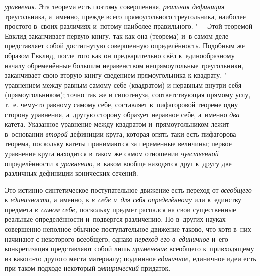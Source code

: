 {\em уравнения}. Эта
теорема есть поэтому совершенная,
{\em реальная дефиниция}
треугольника, а~именно, прежде всего прямоугольного
треугольника, наиболее простого в~своих различиях и~потому наиболее
правильного. "--- Этой теоремой Евклид заканчивает первую
книгу, так как она (теорема) и~в самом деле представляет собой достигнутую
совершенную определённость. Подобным же образом Евклид, после того как он
предварительно свёл к~единообразному
началу
обременённые большим неравенством непрямоугольные
треугольники, заканчивает свою вторую книгу сведением прямоугольника к
квадрату, "--- уравнением между равным самому себе (квадратом)
и
неравным внутри себя (прямоугольником); точно так же и
гипотенуза, соответствующая прямому углу, т.~е. чему-то равному самому
себе, составляет в~пифагоровой теореме одну сторону уравнения, а~другую
сторону образует неравное себе, а~именно
{\em два} катета.
Указанное уравнение между квадратом и~прямоугольником лежит в~основании
{\em второй} дефиниции
круга, которая опять-таки есть пифагорова теорема, поскольку катеты
принимаются за переменные величины; первое уравнение круга находится в
таком же самом отношении
{\em чувственной}
определённости к
{\em уравнению,} в~каком
вообще находятся друг к~другу две различных дефиниции конических сечений.

Это истинно синтетическое поступательное движение есть переход
от {\em всеобщего} к
{\em единичности,} а
именно, к {\em в~себе и~для себя
определённому} или к~единству предмета
{\em в~самом себе,}
поскольку предмет распался на свои существенные реальные
определённости и~подвергся различению. Но в~других науках совершенно
неполное обычное поступательное движение таково, что хотя в~них начинают с
некоторого всеобщего, однако
{\em переход его в~единичное}
и~его конкретизация представляют собой лишь
{\em применение}
всеобщего к~привходящему из какого-то другого места
материалу; подлинное {\em единичное,}
единичное идеи есть при таком подходе некоторый
{\em эмпирический} придаток.

